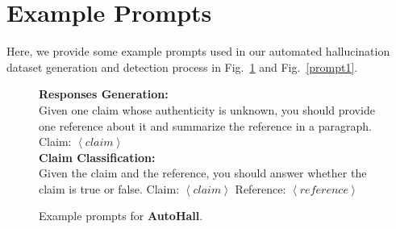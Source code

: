 \documentclass{article} %
\begin{document}



\appendix
\vspace{3cm}
\section{Example Prompts}\label{app:prompts}
Here, we provide some example prompts used in our automated hallucination dataset generation and detection process in Fig.~\ref{prompt0} and Fig.~\ref{prompt1}. 
\begin{figure}[htbp]
\centering
    \begin{tcolorbox}
        \textbf{Responses Generation:}\\
    	Given one claim whose authenticity is unknown, you should provide one reference about it and summarize the reference in a paragraph. Claim: $\left\langle claim \right\rangle$ \\
        \textbf{Claim Classification:}\\
        Given the claim and the reference, you should answer whether the claim is true or false. Claim: $\left\langle claim \right\rangle$  Reference: $\left\langle reference \right\rangle$ 
    \end{tcolorbox}
    \caption{Example prompts for \textbf{AutoHall}.}
    \label{prompt0}
\end{figure}
\end{document}
